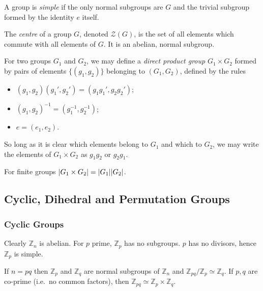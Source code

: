 \documentclass[a4paper,11pt]{article}
\begin{document}
	\begin{defi}
		A group is \emph{simple} if the only normal subgroups are $G$ and the trivial subgroup formed by the identity $e$ itself.
	\end{defi}

	\begin{defi}
		The \emph{centre} of a group $G$, denoted $\mathcal{Z}(G)$, is the set of all elements which commute with all elements of $G$. It is an abelian, normal subgroup.
	\end{defi}
	
	\begin{defi}
		For two groups $G_1$ and $G_2$, we may define a \emph{direct product group} $G_1 \times G_2$ formed by pairs of elements $\{(g_1,g_2)\}$ belonging to $(G_1,G_2)$, defined by the rules 
		\begin{itemize}
			\item $(g_1, g_2)(g_1',g_2') = (g_1 g_1', g_2 g_2')$;
			\item $(g_1, g_2)^{-1} = (g_1^{-1}, g_2^{-1})$;
			\item $e = (e_1,e_2)$.
		\end{itemize}

		So long as it is clear which elements belong to $G_1$ and which to $G_2$, we may write the elements of $G_1 \times G_2$ as $g_1 g_2$ or $g_2 g_1$.
	\end{defi}

	\begin{cor}
		For finite groups $\abs{G_1 \times G_2} = \abs{G_1}\abs{G_2}$.
	\end{cor}

	\subsection{Cyclic, Dihedral and Permutation Groups}
	\subsubsection{Cyclic Groups}

	Clearly $\mathbb{Z}_n$ is abelian. For $p$ prime, $\mathbb{Z}_p$ has no subgroups. $p$ has no divisors, hence $\mathbb{Z}_p$ is simple.

	\begin{prop}
		If $n = pq$ then $\mathbb{Z}_p$ and $\mathbb{Z}_q$ are normal subgroups of $\mathbb{Z}_n$ and $\mathbb{Z}_{pq} / \mathbb{Z}_p \simeq \mathbb{Z}_q$. If $p,q$ are co-prime (i.e.\ no common factors), then $\mathbb{Z}_{pq} \simeq \mathbb{Z}_p \times \mathbb{Z}_q$.
	\end{prop}
\end{document}
